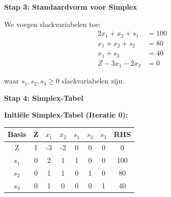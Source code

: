 \documentclass[a4paper,11pt]{article}
\begin{document}
\begin{oefenblok}
    \textbf{Stap 3: Standaardvorm voor Simplex}

    We voegen slackvariabelen toe:
    \begin{align*}
        2x_1 + x_2 + s_1 & = 100 \\
        x_1 + x_2 + s_2  & = 80  \\
        x_1 + s_3        & = 40  \\
        Z - 3x_1 - 2x_2  & = 0
    \end{align*}

    waar $s_1, s_2, s_3 \geq 0$ slackvariabelen zijn.

    \textbf{Stap 4: Simplex-Tabel}

    \textbf{Initiële Simplex-Tabel (Iteratie 0):}

    \vspace{0.3cm}

    \begin{center}
        \begin{tabular}{|c|c|c|c|c|c|c|c|}
            \hline
            \textbf{Basis} & \textbf{Z} & \textbf{$x_1$} & \textbf{$x_2$} & \textbf{$s_1$} & \textbf{$s_2$} & \textbf{$s_3$} & \textbf{RHS} \\
            \hline
            Z              & 1          & -3             & -2             & 0              & 0              & 0              & 0            \\
            \hline
            $s_1$          & 0          & 2              & 1              & 1              & 0              & 0              & 100          \\
            \hline
            $s_2$          & 0          & 1              & 1              & 0              & 1              & 0              & 80           \\
            \hline
            $s_3$          & 0          & 1              & 0              & 0              & 0              & 1              & 40           \\
            \hline
        \end{tabular}
    \end{center}
    \FloatBarrier


\end{oefenblok}
\end{document}
